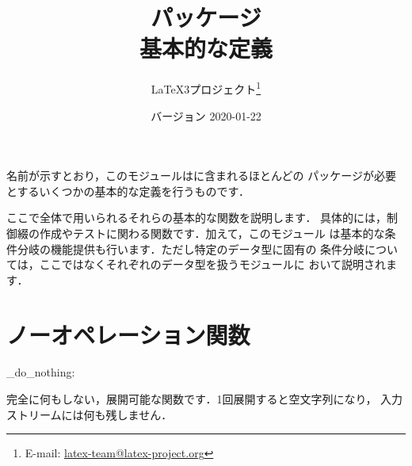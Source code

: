 \documentclass[uplatex,dvipdfmx,full,kernel]{wtpl3doc}
\begin{document}
\title{パッケージ\\ 基本的な定義}
\author{%
 \LaTeX3プロジェクト\thanks
   {%
     E-mail:
       \href{mailto:latex-team@latex-project.org}
         {latex-team@latex-project.org}%
   }%
}
\date{バージョン 2020-01-22}

\maketitle

\begin{documentation}

名前が示すとおり，このモジュールはに含まれるほとんどの
パッケージが必要とするいくつかの基本的な定義を行うものです．

ここで全体で用いられるそれらの基本的な関数を説明します．
具体的には，制御綴の作成やテストに関わる関数です．加えて，このモジュール
は基本的な条件分岐の機能提供も行います．ただし特定のデータ型に固有の
条件分岐については，ここではなくそれぞれのデータ型を扱うモジュールに
おいて説明されます．

\section{ノーオペレーション関数}

\begin{function}[EXP]{\prg_do_nothing:}
  \begin{syntax}
  \end{syntax}
  完全に何もしない，展開可能な関数です．1回展開すると空文字列になり，
  入力ストリームには何も残しません．
\end{function}


\end{documentation}
\end{document}
